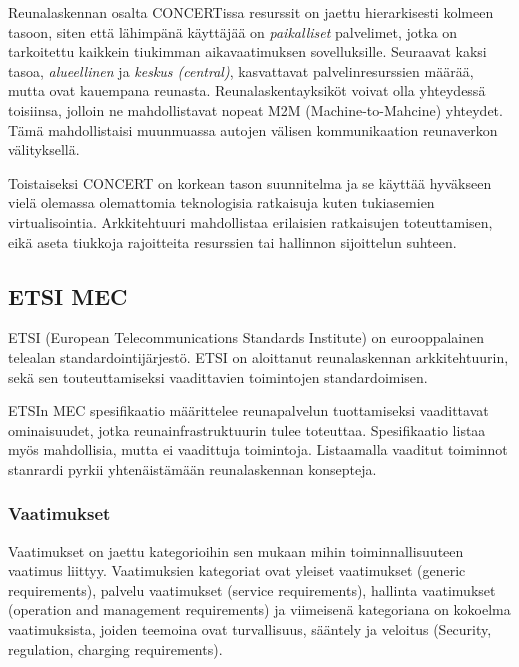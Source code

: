 \documentclass[finnish]{tktltiki2}
\theoremstyle{definition}
\theoremstyle{remark}
\begin{document}
 Reunalaskennan osalta CONCERTissa resurssit on jaettu hierarkisesti kolmeen tasoon, siten että lähimpänä käyttäjää on \textit{paikalliset} palvelimet, jotka on tarkoitettu kaikkein tiukimman aikavaatimuksen sovelluksille. Seuraavat kaksi tasoa, \textit{alueellinen} ja \textit{keskus (central)}, kasvattavat palvelinresurssien määrää, mutta ovat kauempana reunasta. Reunalaskentayksiköt voivat olla yhteydessä toisiinsa, jolloin ne mahdollistavat nopeat M2M (Machine-to-Mahcine) yhteydet. Tämä mahdollistaisi muunmuassa autojen välisen kommunikaation reunaverkon välityksellä. 

Toistaiseksi CONCERT on korkean tason suunnitelma ja se käyttää hyväkseen vielä olemassa olemattomia teknologisia ratkaisuja kuten tukiasemien virtualisointia. Arkkitehtuuri mahdollistaa erilaisien ratkaisujen toteuttamisen, eikä aseta tiukkoja rajoitteita resurssien tai hallinnon sijoittelun suhteen.

\subsection{ETSI MEC}
ETSI (European Telecommunications Standards Institute) on eurooppalainen telealan standardointijärjestö.
ETSI on aloittanut reunalaskennan arkkitehtuurin, sekä sen touteuttamiseksi vaadittavien toimintojen standardoimisen.

ETSIn MEC spesifikaatio määrittelee reunapalvelun tuottamiseksi vaadittavat ominaisuudet, jotka reunainfrastruktuurin tulee toteuttaa.
Spesifikaatio listaa myös mahdollisia, mutta ei vaadittuja toimintoja. 
Listaamalla vaaditut toiminnot stanrardi pyrkii yhtenäistämään reunalaskennan konsepteja.  

\subsubsection{Vaatimukset}
Vaatimukset on jaettu kategorioihin sen mukaan mihin toiminnallisuuteen vaatimus liittyy.
Vaatimuksien kategoriat ovat yleiset vaatimukset (generic requirements), palvelu vaatimukset (service requirements), hallinta vaatimukset (operation and management requirements) ja viimeisenä kategoriana on kokoelma vaatimuksista, joiden teemoina ovat turvallisuus, sääntely ja veloitus (Security, regulation, charging requirements)\cite{etsitechreq}. 
\end{document}
